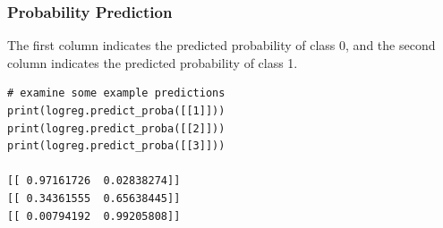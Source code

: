 \begin{frame}[fragile]\frametitle{Probability Prediction}

The first column indicates the predicted probability of class 0, and the second column indicates the predicted probability of class 1.

\begin{lstlisting}
# examine some example predictions
print(logreg.predict_proba([[1]]))
print(logreg.predict_proba([[2]]))
print(logreg.predict_proba([[3]]))

[[ 0.97161726  0.02838274]]
[[ 0.34361555  0.65638445]]
[[ 0.00794192  0.99205808]]
\end{lstlisting}

\end{frame}

